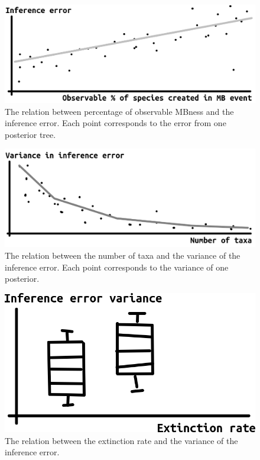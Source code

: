 \begin{figure}[!htbp]
  \includegraphics[width=\textwidth]{figure_2.png}
  \caption{
    The relation between percentage of observable MBness and
    the inference error. Each point corresponds to the error from
    one posterior tree.
  }
  \label{fig:mbness_and_error}
\end{figure}

\begin{figure}[!htbp]
  \includegraphics[width=\textwidth]{figure_3.png}
  \caption{
    The relation between the number of taxa and the
    variance of the inference error. 
    Each point corresponds to the variance of one posterior.
  }
  \label{fig:n_taxa_and_error_variance}
\end{figure}

\begin{figure}[!htbp]
  \includegraphics[width=\textwidth]{figure_4.png}
  \caption{
    The relation between the extinction rate and the
    variance of the inference error. 
  }
  \label{fig:ext_rate_and_error_variance}
\end{figure}

